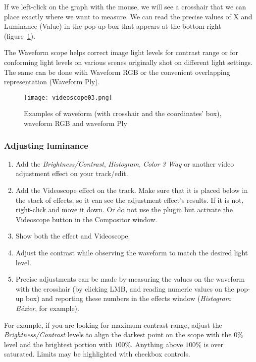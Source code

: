 If we left-click on the graph with the mouse, we will see a crosshair that we can place exactly where we want to measure. We can read the precise values of X and Luminance (Value) in the pop-up box that appears at the bottom right (figure~\ref{fig:videoscope03}).

The Waveform scope helps correct image light levels for contrast range or for conforming light levels on various scenes originally shot on different light settings. The same can be done with Waveform RGB or the convenient overlapping representation (Waveform Ply).

\begin{figure}[hbtp]
    \centering
    \texttt{[image: videoscope03.png]}
    \caption{Examples of waveform (with crosshair and the coordinates' box), waveform RGB and waveform Ply}
    \label{fig:videoscope03}
\end{figure}

\subsubsection*{Adjusting luminance}%
\label{ssub:adjusting_luminance}

\begin{enumerate}
    \item Add the \textit{Brightness/Contrast}, \textit{Histogram}, \textit{Color 3 Way} or another video adjustment effect on your track/edit.
    \item Add the Videoscope effect on the track. Make sure that it is placed below in the stack of effects, so it can see the adjustment effect's results. If it is not, right-click and move it down. Or do not use the plugin but activate the Videoscope button in the Compositor window.
    \item Show both the effect and Videoscope.
    \item Adjust the contrast while observing the waveform to match the desired light level.
    \item Precise adjustments can be made by measuring the values on the waveform with the crosshair (by clicking LMB, and reading numeric values on the pop-up box) and reporting these numbers in the effects window (\textit{Histogram Bézier}, for example).
\end{enumerate}

For example, if you are looking for maximum contrast range, adjust the \textit{Brightness/Contrast} levels to align the darkest point on the scope with the $0\%$ level and the brightest portion with $100\%$. Anything above $100\%$ is over saturated. Limits may be highlighted with checkbox controls.

